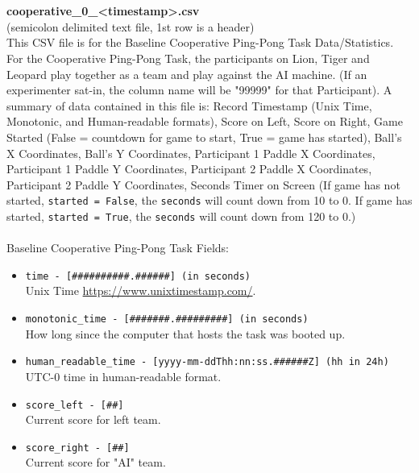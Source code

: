 \begin{description}
\begin{addmargin}[0em]{0em}
        \textbf{\\\\}
        \begin{addmargin}[1em]{0em} %
            \label{cooperative_0_<timestamp>.csv}
            \textbf{cooperative\_0\_<timestamp>.csv}\\(semicolon delimited text file, 1st row is a header)\\
            This CSV file is for the Baseline Cooperative Ping-Pong Task Data/Statistics.
            For the Cooperative Ping-Pong Task, the participants on Lion, Tiger and Leopard play together as a team and play against the AI machine.
            (If an experimenter sat-in, the column name will be "99999" for that Participant).
            A summary of data contained in this file is: Record Timestamp (Unix Time, Monotonic, and Human-readable formats),
            Score on Left, Score on Right, Game Started (False = countdown for game to start, True = game has started),
            Ball's X Coordinates, Ball's Y Coordinates, Participant 1 Paddle X Coordinates, Participant 1 Paddle Y Coordinates,
            Participant 2 Paddle X Coordinates, Participant 2 Paddle Y Coordinates, Seconds Timer on Screen (If game has not started, \verb|started = False|,
            the \verb|seconds| will count down from 10 to 0. If game has started, \verb|started = True|, the \verb|seconds| will count down from 120 to 0.)\\\\
            Baseline Cooperative Ping-Pong Task Fields:
            \begin{itemize}
                \item \verb|time - [##########.######] (in seconds)|\\Unix Time \href{https://www.unixtimestamp.com/}{https://www.unixtimestamp.com/}.
                \item \verb|monotonic_time - [#######.#########] (in seconds)|\\How long since the computer that hosts the task was booted up.
                \item \verb|human_readable_time - [yyyy-mm-ddThh:nn:ss.######Z] (hh in 24h)|\\UTC-0 time in human-readable format.
                \item \verb|score_left - [##]|\\Current score for left team.
                \item \verb|score_right - [##]|\\Current score for "AI" team.

\end{itemize}
\end{addmargin}
\end{addmargin}
\end{description}
